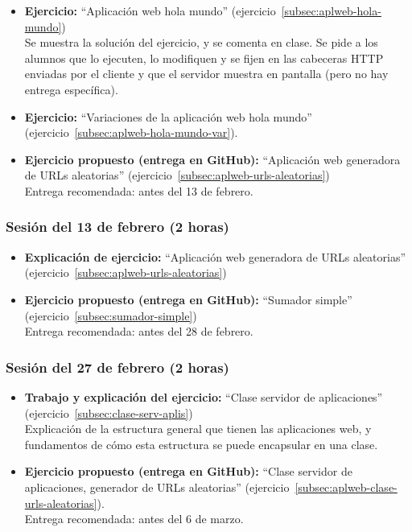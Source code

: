 \documentclass[a4paper,12pt]{article}
\begin{document}
\begin{itemize}
 \item \textbf{Ejercicio:} ``Aplicación web hola mundo'' (ejercicio~\ref{subsec:aplweb-hola-mundo}) \\
   Se muestra la solución del ejercicio, y se comenta en clase. Se pide a los alumnos que lo ejecuten, lo modifiquen y se fijen en las cabeceras HTTP enviadas por el cliente y que el servidor muestra en pantalla (pero no hay entrega específica).
 \item \textbf{Ejercicio:} ``Variaciones de la aplicación web hola mundo'' (ejercicio~\ref{subsec:aplweb-hola-mundo-var}).
 \item \textbf{Ejercicio propuesto (entrega en GitHub):} ``Aplicación web generadora de URLs aleatorias'' (ejercicio~\ref{subsec:aplweb-urls-aleatorias}) \\
   Entrega recomendada: antes del 13 de febrero.
\end{itemize}

\subsubsection{Sesión del 13 de febrero (2 horas)}

\begin{itemize}
\item \textbf{Explicación de ejercicio:} ``Aplicación web generadora de URLs aleatorias'' (ejercicio~\ref{subsec:aplweb-urls-aleatorias})
\item \textbf{Ejercicio propuesto (entrega en GitHub):} ``Sumador simple'' (ejercicio~\ref{subsec:sumador-simple}) \\
  Entrega recomendada: antes del 28 de febrero.
\end{itemize}

\subsubsection{Sesión del 27 de febrero (2 horas)}

\begin{itemize}
\item \textbf{Trabajo y explicación del ejercicio:} ``Clase servidor de aplicaciones'' (ejercicio~\ref{subsec:clase-serv-aplis}) \\
  Explicación de la estructura general que tienen las aplicaciones web, y fundamentos de cómo esta estructura se puede encapsular en una clase.
\item \textbf{Ejercicio propuesto (entrega en GitHub):} ``Clase servidor de aplicaciones, generador de URLs aleatorias'' (ejercicio~\ref{subsec:aplweb-clase-urls-aleatorias}). \\
  Entrega recomendada: antes del 6 de marzo.
\end{itemize}
\end{document}
